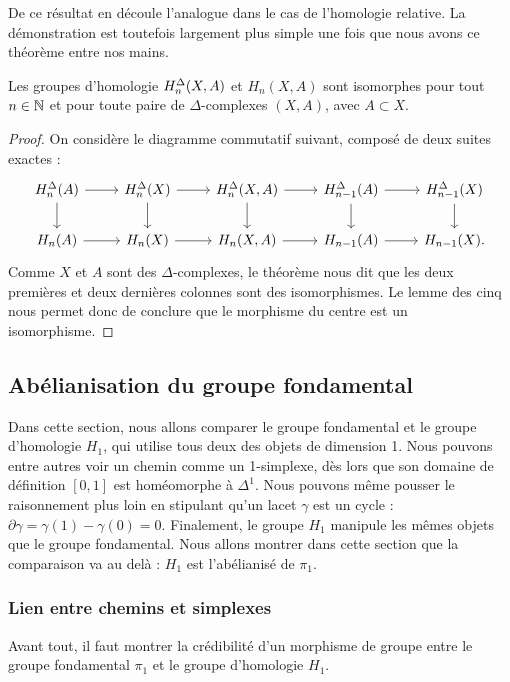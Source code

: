 De ce résultat en découle l'analogue dans le cas de l'homologie relative. La démonstration est toutefois largement plus simple une fois que nous avons ce théorème entre nos mains.

\begin{corollary}
Les groupes d'homologie $H^\Delta_n(X,A)$ et $H_n(X,A)$ sont isomorphes pour tout $n\in\mathbb{N}$ et pour toute paire de $\Delta$-complexes $(X,A)$, avec $A\subset X$.
\end{corollary}

\begin{proof}
On considère le diagramme commutatif suivant, composé de deux suites exactes : \[\begin{tikzcd}
\homsimp_n(A)\arrow[r]\arrow[d]&\homsimp_n(X)\arrow[r]\arrow[d]&\homsimp_n(X,A)\arrow[r]\arrow[d]&\homsimp_{n-1}(A)\arrow[r]\arrow[d]&\homsimp_{n-1}(X)\arrow[d]\\
H_n(A)\arrow[r]&H_n(X)\arrow[r]&H_n(X,A)\arrow[r]&H_{n-1}(A)\arrow[r]&H_{n-1}(X).
\end{tikzcd}\]Comme $X$ et $A$ sont des $\Delta$-complexes, le théorème nous dit que les deux premières et deux dernières colonnes sont des isomorphismes. Le lemme des cinq nous permet donc de conclure que le morphisme du centre est un isomorphisme.
\end{proof}

\subsection{Abélianisation du groupe fondamental}\label{sect:abelianisation}

Dans cette section, nous allons comparer le groupe fondamental et le groupe d'homologie $H_1$, qui utilise tous deux des objets de dimension 1. Nous pouvons entre autres voir un chemin comme un 1-simplexe, dès lors que son domaine de définition $[0,1]$ est homéomorphe à $\Delta^1$. Nous pouvons même pousser le raisonnement plus loin en stipulant qu'un lacet $\gamma$ est un cycle : $\partial\gamma=\gamma(1)-\gamma(0)=0$. Finalement, le groupe $H_1$ manipule les mêmes objets que le groupe fondamental. Nous allons montrer dans cette section que la comparaison va au delà : $H_1$ est l'abélianisé de $\pi_1$.

\subsubsection{Lien entre chemins et simplexes}

Avant tout, il faut montrer la crédibilité d'un morphisme de groupe entre le groupe fondamental $\pi_1$ et le groupe d'homologie $H_1$.

